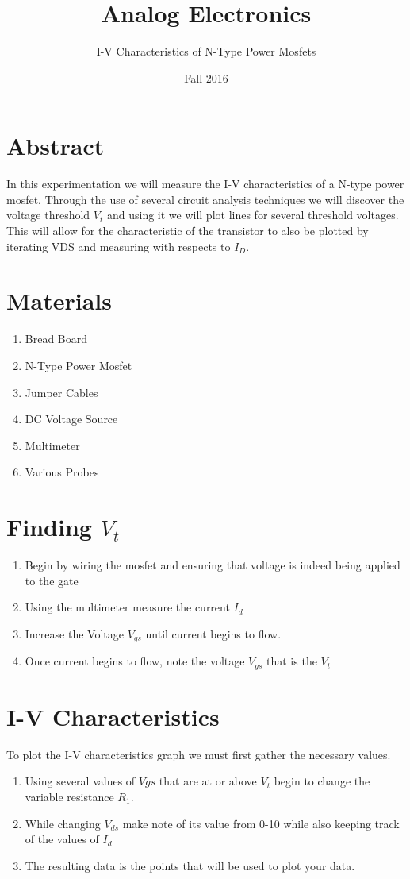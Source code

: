 \documentclass[12pt]{article}
\begin{document}
\title{Analog Electronics}
\author{I-V Characteristics of N-Type Power Mosfets}
\date{Fall 2016}
\maketitle

\newpage
\section{Abstract}

In this experimentation we will measure the I-V characteristics of a N-type power mosfet. Through the use of several circuit analysis techniques we will discover the voltage threshold $V_t$ and using it we will plot lines for several threshold voltages. This will allow for the characteristic of the transistor to also be plotted by iterating VDS and measuring with respects to $I_D$.
\section{Materials}
\begin{enumerate}
	\item Bread Board
	\item N-Type Power Mosfet
	\item Jumper Cables
	\item DC Voltage Source
	\item Multimeter
	\item Various Probes
\end{enumerate}


\section{Finding $V_t$}
\begin{enumerate}
	\item Begin by wiring the mosfet and ensuring that voltage is indeed being applied to the gate
	\item Using the multimeter measure the current $I_d$
	\item Increase the Voltage $V_{gs}$ until current begins to flow.
	\item Once current begins to flow, note the voltage $V_{gs}$ that is the $V_t$
\end{enumerate}

\section{I-V Characteristics}
To plot the I-V characteristics graph we must first gather the necessary values.
\begin{enumerate}
	\item Using several values of $V{gs}$ that are at or above $V_{t}$ begin to change the variable resistance $R_1$.
	\item While changing $V_{ds}$ make note of its value from 0-10 while also keeping track of the values of $I_d$
	\item The resulting data is the points that will be used to plot your data.
\end{enumerate}
\end{document}
